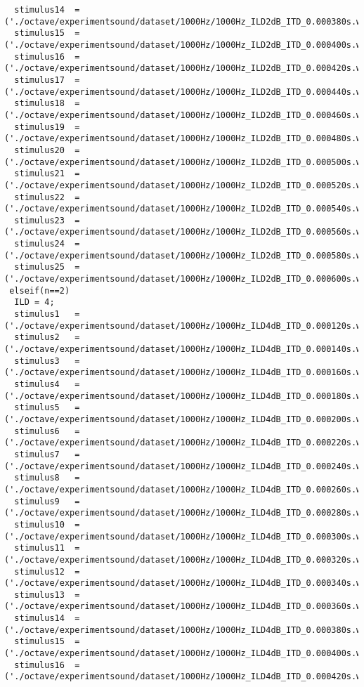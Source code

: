 {\begin{verbatim}
  stimulus14  =('./octave/experimentsound/dataset/1000Hz/1000Hz_ILD2dB_ITD_0.000380s.wav');
  stimulus15  =('./octave/experimentsound/dataset/1000Hz/1000Hz_ILD2dB_ITD_0.000400s.wav');
  stimulus16  =('./octave/experimentsound/dataset/1000Hz/1000Hz_ILD2dB_ITD_0.000420s.wav');
  stimulus17  =('./octave/experimentsound/dataset/1000Hz/1000Hz_ILD2dB_ITD_0.000440s.wav');
  stimulus18  =('./octave/experimentsound/dataset/1000Hz/1000Hz_ILD2dB_ITD_0.000460s.wav');
  stimulus19  =('./octave/experimentsound/dataset/1000Hz/1000Hz_ILD2dB_ITD_0.000480s.wav');
  stimulus20  =('./octave/experimentsound/dataset/1000Hz/1000Hz_ILD2dB_ITD_0.000500s.wav');
  stimulus21  =('./octave/experimentsound/dataset/1000Hz/1000Hz_ILD2dB_ITD_0.000520s.wav');
  stimulus22  =('./octave/experimentsound/dataset/1000Hz/1000Hz_ILD2dB_ITD_0.000540s.wav');
  stimulus23  =('./octave/experimentsound/dataset/1000Hz/1000Hz_ILD2dB_ITD_0.000560s.wav');
  stimulus24  =('./octave/experimentsound/dataset/1000Hz/1000Hz_ILD2dB_ITD_0.000580s.wav');
  stimulus25  =('./octave/experimentsound/dataset/1000Hz/1000Hz_ILD2dB_ITD_0.000600s.wav');
 elseif(n==2)
  ILD = 4;
  stimulus1   =('./octave/experimentsound/dataset/1000Hz/1000Hz_ILD4dB_ITD_0.000120s.wav');
  stimulus2   =('./octave/experimentsound/dataset/1000Hz/1000Hz_ILD4dB_ITD_0.000140s.wav');
  stimulus3   =('./octave/experimentsound/dataset/1000Hz/1000Hz_ILD4dB_ITD_0.000160s.wav');
  stimulus4   =('./octave/experimentsound/dataset/1000Hz/1000Hz_ILD4dB_ITD_0.000180s.wav');
  stimulus5   =('./octave/experimentsound/dataset/1000Hz/1000Hz_ILD4dB_ITD_0.000200s.wav');
  stimulus6   =('./octave/experimentsound/dataset/1000Hz/1000Hz_ILD4dB_ITD_0.000220s.wav');
  stimulus7   =('./octave/experimentsound/dataset/1000Hz/1000Hz_ILD4dB_ITD_0.000240s.wav');
  stimulus8   =('./octave/experimentsound/dataset/1000Hz/1000Hz_ILD4dB_ITD_0.000260s.wav');
  stimulus9   =('./octave/experimentsound/dataset/1000Hz/1000Hz_ILD4dB_ITD_0.000280s.wav');
  stimulus10  =('./octave/experimentsound/dataset/1000Hz/1000Hz_ILD4dB_ITD_0.000300s.wav');
  stimulus11  =('./octave/experimentsound/dataset/1000Hz/1000Hz_ILD4dB_ITD_0.000320s.wav');
  stimulus12  =('./octave/experimentsound/dataset/1000Hz/1000Hz_ILD4dB_ITD_0.000340s.wav');
  stimulus13  =('./octave/experimentsound/dataset/1000Hz/1000Hz_ILD4dB_ITD_0.000360s.wav');
  stimulus14  =('./octave/experimentsound/dataset/1000Hz/1000Hz_ILD4dB_ITD_0.000380s.wav');
  stimulus15  =('./octave/experimentsound/dataset/1000Hz/1000Hz_ILD4dB_ITD_0.000400s.wav');
  stimulus16  =('./octave/experimentsound/dataset/1000Hz/1000Hz_ILD4dB_ITD_0.000420s.wav');

\end{verbatim}}
